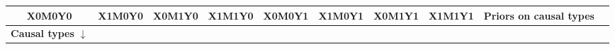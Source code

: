 \documentclass[
  12pt,
]{book}
\begin{document}
\begin{longtable}[]{@{}cccccccccc@{}}
\begin{minipage}[b]{0.05\columnwidth}
X0M0Y0\strut
\end{minipage} & \begin{minipage}[b]{0.05\columnwidth}\centering
X1M0Y0\strut
\end{minipage} & \begin{minipage}[b]{0.05\columnwidth}\centering
X0M1Y0\strut
\end{minipage} & \begin{minipage}[b]{0.05\columnwidth}\centering
X1M1Y0\strut
\end{minipage} & \begin{minipage}[b]{0.05\columnwidth}\centering
X0M0Y1\strut
\end{minipage} & \begin{minipage}[b]{0.05\columnwidth}\centering
X1M0Y1\strut
\end{minipage} & \begin{minipage}[b]{0.05\columnwidth}\centering
X0M1Y1\strut
\end{minipage} & \begin{minipage}[b]{0.05\columnwidth}\centering
X1M1Y1\strut
\end{minipage} & \begin{minipage}[b]{0.14\columnwidth}\centering
Priors on causal types\strut
\end{minipage}\tabularnewline
\midrule
\endhead
\begin{minipage}[t]{0.23\columnwidth}\centering
\textbf{Causal types} \(\downarrow\)\strut
\end{minipage} & \begin{minipage}[t]{0.05\columnwidth}\centering
\strut
\end{minipage} & \begin{minipage}[t]{0.05\columnwidth}\centering
\strut
\end{minipage} & \begin{minipage}[t]{0.05\columnwidth}\centering
\strut
\end{minipage} & \begin{minipage}[t]{0.05\columnwidth}\centering
\strut
\end{minipage} & \begin{minipage}[t]{0.05\columnwidth}\centering
\strut
\end{minipage} & \begin{minipage}[t]{0.05\columnwidth}\centering
\strut
\end{minipage} & \begin{minipage}[t]{0.05\columnwidth}\centering
\strut
\end{minipage} & \begin{minipage}[t]{0.05\columnwidth}\centering

\end{minipage}
\end{longtable}
\end{document}
